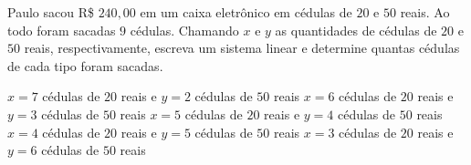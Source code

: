 Paulo sacou R\$ $240{,}00$ em um caixa eletrônico em cédulas de $20$ e $50$ reais. Ao todo foram sacadas $9$ cédulas. Chamando $x$ e $y$ as quantidades de cédulas de $20$ e $50$ reais, respectivamente, escreva um sistema linear e determine quantas cédulas de cada tipo foram sacadas.

$x=7$ cédulas de $20$ reais e $y=2$ cédulas de $50$ reais
$x=6$ cédulas de $20$ reais e $y=3$ cédulas de $50$ reais
$x=5$ cédulas de $20$ reais e $y=4$ cédulas de $50$ reais
$x=4$ cédulas de $20$ reais e $y=5$ cédulas de $50$ reais
$x=3$ cédulas de $20$ reais e $y=6$ cédulas de $50$ reais



